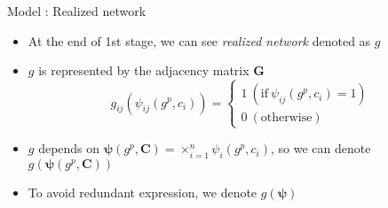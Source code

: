 \documentclass[10pt,dvipdfmx]{beamer}
\begin{document}
\begin{frame}{Model : Realized network}
\begin{itemize}
    \item At the end of 1st stage, we can see {\it{realized network}} denoted as $g$
    \item $g$ is represented by the adjacency matrix $\bm{G}$
    \[ g_{ij}(\psi_{ij}(g^p, c_i)) = 
        \begin{cases}
            1 \  (\text{if} \  \psi_{ij}(g^p, c_i) = 1 ) \\
            0 \  (\text{otherwise})
        \end{cases} \]
    \item $g$ depends on $\bm{\psi}(g^p, \bm{C}) = \times_{i=1}^n \psi_i(g^p, c_i)$, so we can denote $g(\bm{\psi}(g^p, \bm{C}))$
    \item To avoid redundant expression, we denote $g(\bm{\psi})$
\end{itemize}
\end{frame}
\end{document}
